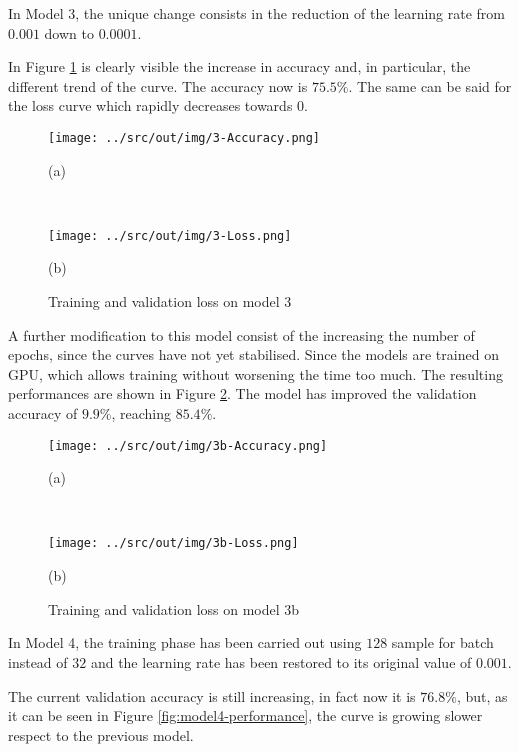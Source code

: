 \documentclass[a4paper,12pt]{article} %
\begin{document}
	In Model 3, the unique change consists in the reduction of the learning 
	rate from $0.001$ down to $0.0001$. 
	
	In Figure \ref{fig:model3-performance} is clearly visible the increase 
	in accuracy and, in particular, the different trend of the curve. The 
	accuracy now is $75.5\%$.
	The same can be said for the loss curve which rapidly decreases towards $0$.
	
	\begin{figure}[H]
		\begin{minipage}[c]{.49\textwidth}
			\centering
			\texttt{[image: ../src/out/img/3-Accuracy.png]}
			\caption*{(a)}
		\end{minipage}
		~
		\begin{minipage}[c]{.49\textwidth}
			\centering
			\texttt{[image: ../src/out/img/3-Loss.png]}
			\caption*{(b)}
		\end{minipage}
		\caption{Training and validation loss on model 3}
		\label{fig:model3-performance}
	\end{figure}

	A further modification to this model consist of the increasing the number 
	of epochs, since the curves have not yet stabilised. Since the models are 
	trained on GPU, which allows training without worsening the time too much. 
	The resulting performances are shown in Figure 
	\ref{fig:model3b-performance}. The model has improved the validation 
	accuracy of $9.9\%$, reaching $85.4\%$.
	
	\begin{figure}[htb]
		\begin{minipage}[c]{.49\textwidth}
			\centering
			\texttt{[image: ../src/out/img/3b-Accuracy.png]}
			\caption*{(a)}
		\end{minipage}
		~
		\begin{minipage}[c]{.49\textwidth}
			\centering
			\texttt{[image: ../src/out/img/3b-Loss.png]}
			\caption*{(b)}
		\end{minipage}
		\caption{Training and validation loss on model 3b}
		\label{fig:model3b-performance}
	\end{figure}


	
	In Model 4, the training phase has been carried out using $128$ sample for 
	batch instead of $32$ and the learning rate has been restored to its 
	original value of $0.001$. 
	
	The current validation accuracy is still increasing, in fact now it is 
	$76.8\%$, but, as it can be seen in Figure \ref{fig:model4-performance}, 
	the curve is growing slower respect to the previous model.
	
\end{document}
